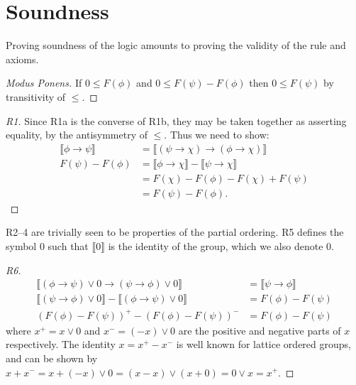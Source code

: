 \documentclass[preprint,leqno]{elsarticle}
\newcommand{\interp}[1]{\llbracket #1 \rrbracket}
\begin{document}
\section{Soundness}

Proving soundness of the logic amounts to proving the validity of the
rule and axioms.


\begin{proof}[Modus Ponens]
If $0 \le F(\phi)$ and $0 \le F(\psi) - F(\phi)$ then
$0 \le F(\psi)$ by transitivity of $\le$.
\end{proof}

\begin{proof}[R1]
  Since R1a is the converse of R1b, they may be taken together as
  asserting equality, by the antisymmetry of $\le$. Thus we need to
  show:
  \begin{align*}
    \interp{\phi \rightarrow \psi} & = \interp{(\psi \rightarrow
      \chi) \rightarrow (\phi \rightarrow \chi)}\\
    F(\psi) - F(\phi) & = \interp{\phi \rightarrow \chi} -
    \interp{\psi \rightarrow \chi}\\
    & = F(\chi) - F(\phi) - F(\chi) + F(\psi)\\
    & = F(\psi) - F(\phi).
  \end{align*}
\end{proof}
R2--4 are trivially seen to be properties of the partial ordering. R5
defines the symbol 0 such that $\interp{0}$ is the identity of the
group, which we also denote 0.

\begin{proof}[R6]
\begin{align*}
  \interp{(\phi \rightarrow \psi)\lor 0 \rightarrow (\psi \rightarrow \phi) \lor 0} &= \interp{\psi \rightarrow \phi}\\
  \interp{(\psi \rightarrow \phi) \lor 0} - \interp{(\phi \rightarrow \psi)\lor 0} &= F(\phi) - F(\psi)\\
  (F(\phi) - F(\psi))^+ - (F(\phi) - F(\psi))^- & =F(\phi) - F(\psi)
\end{align*}
where $x^+ = x\lor 0$ and $x^- = (-x)\lor 0$ are the positive and
negative parts of $x$ respectively. The identity $x = x^+ - x^-$ is
well known for lattice ordered groups, and can be shown by $x + x^- =
x + (-x)\lor 0 = (x - x)\lor(x + 0) = 0\lor x = x^+$.
\end{proof}
\end{document}
